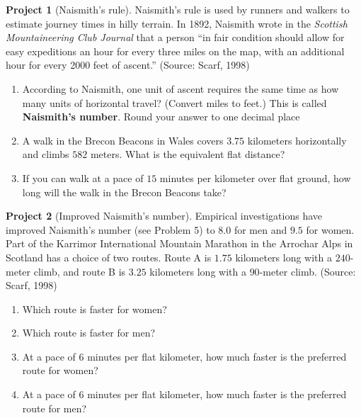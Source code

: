 \documentclass[10pt,]{book}
\newcommand{\terminology}[1]{\textbf{#1}}
\theoremstyle{plain}
\theoremstyle{definition}
\theoremstyle{definition}
\newtheorem{project}{Project}[chapter]
\theoremstyle{definition}
\theoremstyle{definition}
\numberwithin{equation}{part}
\begin{document}
\begin{project}[Naismith's rule]\label{Naismith}
Naismith's rule is used by runners and walkers to estimate journey times in hilly terrain. In 1892, Naismith wrote in the \textsl{Scottish Mountaineering Club Journal} that a person “in fair condition should allow for easy expeditions an hour for every three miles on the map, with an additional hour for every 2000 feet of ascent.” (Source: Scarf, 1998) \leavevmode%
\begin{enumerate}[label=*\alph**]
\item\hypertarget{li-1715}{}According to Naismith, one unit of ascent requires the same time as how many units of horizontal travel? (Convert miles to feet.) This is called \terminology{Naismith's number}. Round your answer to one decimal place%
\item\hypertarget{li-1716}{}A walk in the Brecon Beacons in Wales covers \(3.75\) kilometers horizontally and climbs \(582\) meters. What is the equivalent flat distance?%
\item\hypertarget{li-1717}{}If you can walk at a pace of \(15\) minutes per kilometer over flat ground, how long will the walk in the Brecon Beacons take?%
\end{enumerate}
%
\end{project}
\begin{project}[Improved Naismith's number]\label{project-6}
Empirical investigations have improved Naismith's number (see Problem 5) to \(8.0\) for men and \(9.5\) for women. Part of the Karrimor International Mountain Marathon in the Arrochar Alps in Scotland has a choice of two routes. Route A is \(1.75\) kilometers long with a \(240\)-meter climb, and route B is \(3.25\) kilometers long with a \(90\)-meter climb. (Source: Scarf, 1998) \leavevmode%
\begin{enumerate}[label=*\alph**]
\item\hypertarget{li-1718}{}Which route is faster for women?%
\item\hypertarget{li-1719}{}Which route is faster for men?%
\item\hypertarget{li-1720}{}At a pace of \(6\) minutes per flat kilometer, how much faster is the preferred route for women?%
\item\hypertarget{li-1721}{}At a pace of \(6\) minutes per flat kilometer, how much faster is the preferred route for men?%
\end{enumerate}
%
\end{project}
%
\printindex
%
\end{document}
